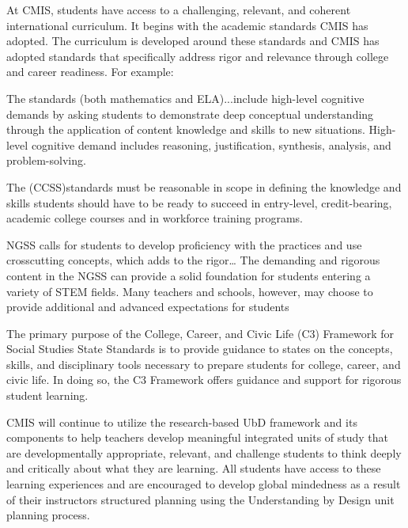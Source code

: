 \documentclass{report}
\begin{document}

\begin{findings}

At CMIS, students have access to a challenging, relevant, and coherent international curriculum. It begins with the academic  standards CMIS has adopted. The curriculum is developed around these standards and CMIS has adopted standards that specifically address rigor and relevance through college and career readiness. For example: 

The standards (both mathematics and ELA)...include high-level cognitive demands by asking students to demonstrate deep conceptual understanding through the application of content knowledge and skills to new situations. High-level cognitive demand includes reasoning, justification, synthesis, analysis, and problem-solving.

The (CCSS)standards must be reasonable in scope in defining the knowledge and skills students should have to be ready to succeed in entry-level, credit-bearing, academic college courses and in workforce training programs.

NGSS calls for students to develop proficiency with the practices and use crosscutting concepts, which adds to the rigor… The demanding and rigorous content in the NGSS can provide a solid foundation for students entering a variety of STEM fields. Many teachers and schools, however, may choose to provide additional and advanced expectations for students

The primary purpose of the College, Career, and Civic Life (C3) Framework for Social Studies State Standards is to provide guidance to states on the concepts, skills, and disciplinary tools necessary to prepare students for college, career, and civic life. In doing so, the C3 Framework offers guidance and support for rigorous student learning.


CMIS will continue to utilize the research-based UbD framework and its components to help teachers develop meaningful integrated units of study  that are developmentally appropriate, relevant, and challenge students to think deeply and critically about what they are learning. All students have access to these learning experiences and are encouraged to develop global mindedness as a result of their instructors structured planning using the Understanding by Design unit planning process. 


\end{findings}
\end{document}
